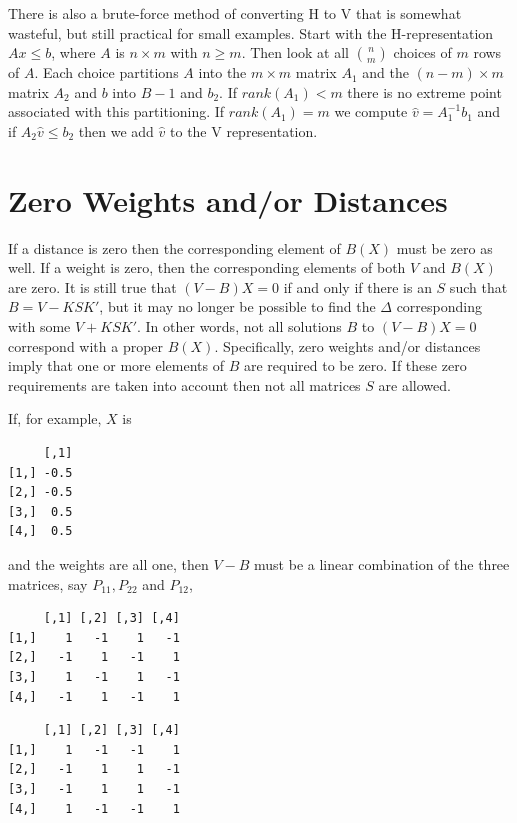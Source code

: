 \documentclass[
  12pt,
  letterpaper,
  DIV=11,
  numbers=noendperiod]{scrreprt}
\theoremstyle{remark}
\begin{document}
There is also a brute-force method of converting H to V that is somewhat
wasteful, but still practical for small examples. Start with the
H-representation \(Ax\leq b\), where \(A\) is \(n\times m\) with
\(n\geq m\). Then look at all \(\binom{n}{m}\) choices of \(m\) rows of
\(A\). Each choice partitions \(A\) into the \(m\times m\) matrix
\(A_1\) and the \((n-m)\times m\) matrix \(A_2\) and \(b\) into \(B-1\)
and \(b_2\). If \(rank(A_1)<m\) there is no extreme point associated
with this partitioning. If \(rank(A_1)=m\) we compute
\(\hat v=A_1^{-1}b_1\) and if \(A_2\hat v\leq b_2\) then we add
\(\hat v\) to the V representation.

\section{Zero Weights and/or
Distances}\label{zero-weights-andor-distances}

If a distance is zero then the corresponding element of \(B(X)\) must be
zero as well. If a weight is zero, then the corresponding elements of
both \(V\) and \(B(X)\) are zero. It is still true that \((V-B)X=0\) if
and only if there is an \(S\) such that \(B=V-KSK'\), but it may no
longer be possible to find the \(\Delta\) corresponding with some
\(V+KSK'\). In other words, not all solutions \(B\) to \((V-B)X=0\)
correspond with a proper \(B(X)\). Specifically, zero weights and/or
distances imply that one or more elements of \(B\) are required to be
zero. If these zero requirements are taken into account then not all
matrices \(S\) are allowed.

If, for example, \(X\) is

\begin{verbatim}
     [,1]
[1,] -0.5
[2,] -0.5
[3,]  0.5
[4,]  0.5
\end{verbatim}

and the weights are all one, then \(V-B\) must be a linear combination
of the three matrices, say \(P_{11}, P_{22}\) and \(P_{12}\),

\begin{verbatim}
     [,1] [,2] [,3] [,4]
[1,]    1   -1    1   -1
[2,]   -1    1   -1    1
[3,]    1   -1    1   -1
[4,]   -1    1   -1    1
\end{verbatim}

\begin{verbatim}
     [,1] [,2] [,3] [,4]
[1,]    1   -1   -1    1
[2,]   -1    1    1   -1
[3,]   -1    1    1   -1
[4,]    1   -1   -1    1
\end{verbatim}
\end{document}
